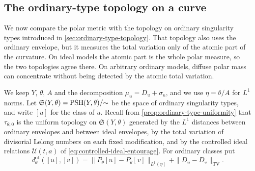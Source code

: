 \subsection{The ordinary-type topology on a curve}
\label{subsec:curve-ordinary-topology}

We now compare the polar metric with the topology on ordinary singularity types introduced in \cref{sec:ordinary-type-topology}. That topology also uses the ordinary envelope, but it measures the total variation only of the atomic part of the curvature. On ideal models the atomic part is the whole polar measure, so the two topologies agree there. On arbitrary ordinary models, diffuse polar mass can concentrate without being detected by the atomic total variation.

We keep $Y$, $\theta$, $A$ and the decomposition $\mu_u=D_u+\sigma_u$, and we use $\eta=\theta/A$ for $L^1$ norms. Let $\mathfrak S(Y,\theta)=\mathrm{PSH}(Y,\theta)/{\sim}$ be the space of ordinary singularity types, and write $[u]$ for the class of $u$. Recall from \cref{prop:ordinary-type-uniformity} that $\tau_{\theta,0}$ is the uniform topology on $\mathfrak S(Y,\theta)$ generated by the $L^1$ distances between ordinary envelopes and between ideal envelopes, by the total variation of divisorial Lelong numbers on each fixed modification, and by the controlled ideal relations $\mathcal U(t,a)$ of \eqref{eq:controlled-ideal-entourage}. For ordinary classes put
\begin{equation}\label{eq:curve-ordinary-type-distance}
 d^{\mathrm{ot}}_\theta([u],[v])
 =\|P_\theta[u]-P_\theta[v]\|_{L^1(\eta)}
     +\|D_u-D_v\|_{\mathrm{TV}}.
\end{equation}

